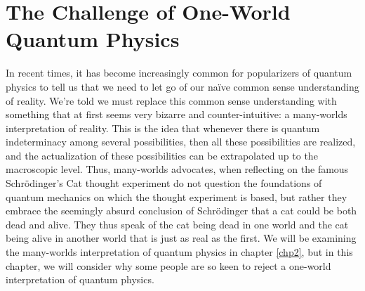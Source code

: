 \begin{comment}
    \section{Introduction}
    \emph{}
    
    Common sense is very often underrated. This is especially so in the light of modern physics. Not infrequently, one hears people claim that modern physics shows us that reality is fundamentally weird and that we must discard our naïve common sense intuitions. Now perhaps these people are right, but if we are to accept their claims, they ought to have really compelling reasons. The usual response to an argument that results in weird or seemingly absurd conclusions is to question the argument's premises or examine whether the argument is logically valid. 
\end{comment}
    \chapter{The Challenge of One-World Quantum Physics}
    In recent times, it has become increasingly common for popularizers of quantum physics to tell us that we need to let go of our naïve common sense understanding of reality. We're told we must replace this common sense understanding with something that at first seems very bizarre and counter-intuitive: a many-worlds interpretation of reality. This is the idea that whenever there is quantum indeterminacy among several possibilities, then all these possibilities are realized, and the actualization of these possibilities can be extrapolated up to the macroscopic level. Thus, many-worlds advocates, when reflecting on the famous Schr\"{o}dinger's Cat thought experiment do not question the foundations of quantum mechanics on which the thought experiment is based, but rather they embrace the seemingly absurd conclusion of Schr\"{o}dinger that a cat could be both dead and alive. They thus speak of the cat being dead in one world and the cat being alive in another world that is just as real as the first. We will be examining the many-worlds interpretation of quantum physics in chapter \ref{chp2}, but in this chapter, we will consider why some people are so keen to reject a one-world interpretation of quantum physics.
    
